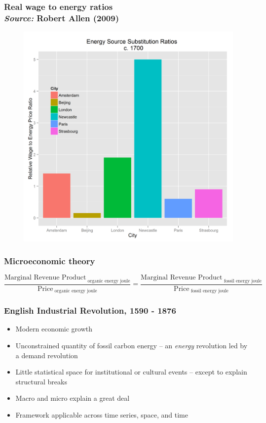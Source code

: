 \documentclass[final]{beamer}
\begin{document}
\begin{frame}
\frametitle{Real wage to energy ratios\\\textit{Source:} Robert Allen (2009)}
\begin{figure}[p!]
\center
\label{fig:wage-energy}
\includegraphics[height=0.8\textheight]{wage-energy.png}
\end{figure}
\end{frame}

\begin{frame}
\frametitle{Microeconomic theory}
\scriptsize{
		\begin{equation}
		\label{eq:mrp}
		\frac{\text{Marginal Revenue Product}_{\text{ organic energy joule}}}{\text{Price}_{\text{ organic energy joule}}} = \frac{\text{Marginal Revenue Product}_{\text{ fossil energy joule}}}{\text{Price}_{\text{ fossil energy joule}}}
		\end{equation}
}
\end{frame}

\begin{frame}
\frametitle{English Industrial Revolution, 1590 - 1876}

	\begin{itemize}
	\item Modern economic growth
	\item Unconstrained quantity of fossil carbon energy -- an \textit{energy} revolution led by a demand revolution
	\item Little statistical space for institutional or cultural events -- except to explain structural breaks
	\item Macro and micro explain a great deal
	\item Framework applicable across time series, space, and time
	\end{itemize}
\end{frame}
\end{document}
